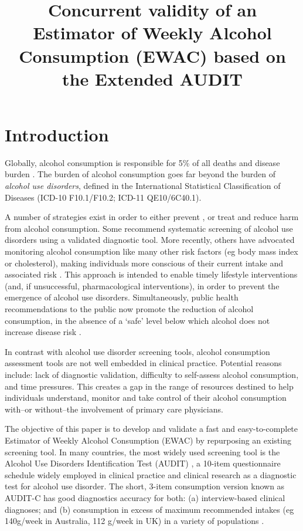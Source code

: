 \documentclass[]{article}
\title{Concurrent validity of an Estimator of Weekly Alcohol Consumption (EWAC)
based on the Extended AUDIT}
\author{}
\date{\vspace{-2.5em}}
\begin{document}
\maketitle

{
\setcounter{tocdepth}{2}
\tableofcontents
}
\hypertarget{introduction}{%
\section{Introduction}\label{introduction}}

Globally, alcohol consumption is responsible for 5\% of all deaths and
disease burden \citep{Shield2020}. The burden of alcohol consumption
goes far beyond the burden of \emph{alcohol use disorders}, defined in
the International Statistical Classification of Diseases (ICD-10
F10.1/F10.2; ICD-11 QE10/6C40.1).

A number of strategies exist in order to either prevent
\citep{NICE-PH24}, or treat and reduce \citep{NICE-CG115} harm from
alcohol consumption. Some recommend systematic screening of alcohol use
disorders using a validated diagnostic tool. More recently, others have
advocated monitoring alcohol consumption like many other risk factors
(eg body mass index or cholesterol), making individuals more conscious
of their current intake and associated risk \citep{Nutt2014, Rehm2016}.
This approach is intended to enable timely lifestyle interventions (and,
if unsuccessful, pharmacological interventions), in order to prevent the
emergence of alcohol use disorders. Simultaneously, public health
recommendations to the public
\citep{AU.alcoguidelines2009, AlcoholCMO2016b} now promote the reduction
of alcohol consumption, in the absence of a `safe' level below which
alcohol does not increase disease risk \citep{Wood2018}.

In contrast with alcohol use disorder screening tools, alcohol
consumption assessment tools are not well embedded in clinical practice.
Potential reasons include: lack of diagnostic validation, difficulty to
self-assess alcohol consumption, and time pressures. This creates a gap
in the range of resources destined to help individuals understand,
monitor and take control of their alcohol consumption with--or
without--the involvement of primary care physicians.

The objective of this paper is to develop and validate a fast and
easy-to-complete Estimator of Weekly Alcohol Consumption (EWAC) by
repurposing an existing screening tool. In many countries, the most
widely used screening tool is the Alcohol Use Disorders Identification
Test (AUDIT) \citep{Babor2001}, a 10-item questionnaire schedule widely
employed in clinical practice and clinical research as a diagnostic test
for alcohol use disorder. The short, 3-item consumption version known as
AUDIT-C has good diagnostics accuracy for both: (a) interview-based
clinical diagnoses; and (b) consumption in excess of maximum recommended
intakes (eg 140g/week in Australia, 112 g/week in UK) in a variety of
populations \citep{DeMeneses-Gaya2009}.
\end{document}
